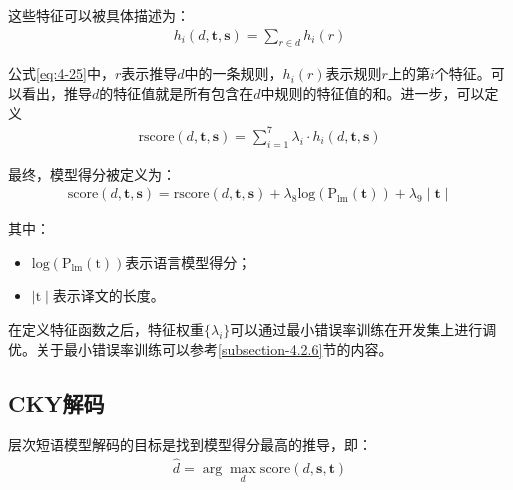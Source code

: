 \parinterval 这些特征可以被具体描述为：
\begin{eqnarray}
h_i (d,\mathbf{t},\mathbf{s})=\sum_{r \in d}h_i (r)
\label{eq:4-25}
\end{eqnarray}

\parinterval 公式\ref{eq:4-25}中，$r$表示推导$d$中的一条规则，$h_i (r)$表示规则$r$上的第$i$个特征。可以看出，推导$d$的特征值就是所有包含在$d$中规则的特征值的和。进一步，可以定义
\begin{eqnarray}
\textrm{rscore}(d,\mathbf{t},\mathbf{s})=\sum_{i=1}^7 \lambda_i \cdot h_i (d,\mathbf{t},\mathbf{s})
\label{eq:4-26}
\end{eqnarray}

\parinterval 最终，模型得分被定义为：
\begin{eqnarray}
\textrm{score}(d,\mathbf{t},\mathbf{s})=\textrm{rscore}(d,\mathbf{t},\mathbf{s})+ \lambda_8 \textrm{log}⁡(\textrm{P}_{\textrm{lm}}(\mathbf{t}))+\lambda_9 \mid \mathbf{t} \mid
\label{eq:4-27}
\end{eqnarray}

\noindent 其中：

\begin{itemize}
\vspace{0.5em}
\item $\textrm{log}⁡(\textrm{P}_{\textrm{lm}}(\textrm{t}))$表示语言模型得分；
\vspace{0.5em}
\item $\mid \textrm{t} \mid$表示译文的长度。
\vspace{0.5em}
\end{itemize}

\parinterval 在定义特征函数之后，特征权重$\{ \lambda_i \}$可以通过最小错误率训练在开发集上进行调优。关于最小错误率训练可以参考\ref{subsection-4.2.6}节的内容。


\subsection{CKY解码}\label{subsection-4.3.4}

\parinterval 层次短语模型解码的目标是找到模型得分最高的推导，即：
\begin{eqnarray}
\hat{d} = \arg\max_{d} \textrm{score}(d,\mathbf{s},\mathbf{t})
\label{eq:4-28}
\end{eqnarray}


